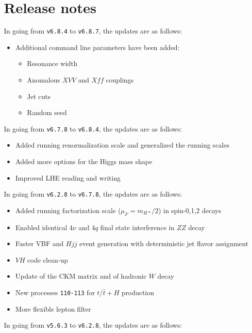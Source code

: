 \documentclass[aps,superscriptaddress,nofootinbib]{revtex4}
\begin{document}

\section{ Release notes }

\noindent
In going from \verb|v6.8.4| to \verb|v6.8.7|, the updates are as follows:

\begin{itemize}
\item Additional command line parameters have been added:
\begin{itemize}
\item Resonance width
\item Anomalous $XVV$ and $Xff$ couplings
\item Jet cuts
\item Random seed
\end{itemize}
\end{itemize}

\noindent
In going from \verb|v6.7.8| to \verb|v6.8.4|, the updates are as follows:

\begin{itemize}
\item Added running renormalization scale and generalized the running scales
\item Added more options for the Higgs mass shape
\item Improved LHE reading and writing
\end{itemize}

\noindent
In going from \verb|v6.2.8| to \verb|v6.7.8|, the updates are as follows:

\begin{itemize}
\item Added running factorization scale ($\mu_F=m_{H*}/2$) in spin-0,1,2 decays
\item Enabled identical 4$\nu$ and 4$q$ final state interference in $ZZ$ decay
\item Faster VBF and $Hjj$ event generation with deterministic jet flavor assignment
\item $VH$ code clean-up
\item Update of the CKM matrix and of hadronic $W$ decay
\item New processes \verb|110-113| for $t/\bar{t}+H$ production
\item More flexible lepton filter
\end{itemize}

\noindent
In going from \verb|v5.6.3| to \verb|v6.2.8|, the updates are as follows:
\end{document}
